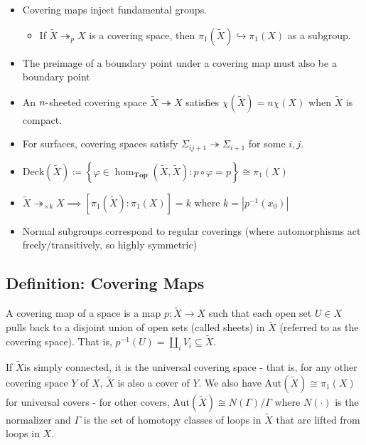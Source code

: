 \begin{itemize}
\tightlist
\item
  Covering maps inject fundamental groups.

  \begin{itemize}
  \tightlist
  \item
    If \(\tilde X \twoheadrightarrow_p X\) is a covering space, then
    \(\pi_1(\tilde X) \hookrightarrow\pi_1 (X)\) as a subgroup.
  \end{itemize}
\item
  The preimage of a boundary point under a covering map must also be a
  boundary point
\item
  An \(n{\hbox{-}}\)sheeted covering space
  \(\tilde X \twoheadrightarrow X\) satisfies
  \(\chi(\tilde X) = n\chi(X)\) when \(\tilde X\) is compact.
\item
  For surfaces, covering spaces satisfy
  \(\Sigma_{ij + 1} \twoheadrightarrow\Sigma_{i+1}\) for some \(i, j\).
\item
  \(\mathrm{Deck}(\tilde X) \coloneqq\left\{{\varphi \in \hom_{\mathbf{Top}}(\tilde X, \tilde X): p\circ \varphi = p}\right\} \cong \pi_1(X)\)
\item
  \(\tilde X \twoheadrightarrow_{\times k} X \implies [\pi_1(\tilde X) : \pi_1(X)] = k\)
  where \(k =|p^{-1}(x_0)|\)
\item
  Normal subgroups correspond to regular coverings (where automorphisms
  act freely/transitively, so highly symmetric)
\end{itemize}

\hypertarget{definition-covering-maps}{%
\subsection{Definition: Covering Maps}\label{definition-covering-maps}}

A covering map of a space is a map \(p: \tilde X \to X\) such that each
open set \(U\in X\) pulls back to a disjoint union of open sets (called
sheets) in \(\tilde X\) (referred to as the covering space). That is,
\(p^{-1}(U) = \coprod_i V_i \subseteq \tilde X\).

If \(\tilde X\)is simply connected, it is the universal covering space -
that is, for any other covering space \(Y\) of \(X\), \(\tilde X\) is
also a cover of \(Y\). We also have
\(\text{Aut}(\tilde X) \cong \pi_1(X)\) for universal covers - for other
covers, \(\text{Aut}(\tilde X) \cong N(\Gamma) / \Gamma\) where
\(N(\cdot)\) is the normalizer and \(\Gamma\) is the set of homotopy
classes of loops in \(\tilde X\) that are lifted from loops in \(X\).

